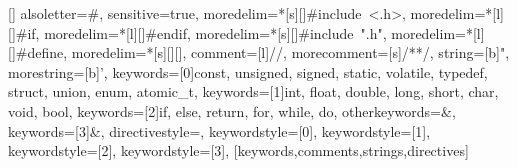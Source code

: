                   []{}
                  { alsoletter={\#},
                    sensitive=true,
                    moredelim=*[s][{\color{violet!60!white}}]{\#include\ <}{.h>},
                    moredelim=*[l][{\color{blue!65!white}}]\#if,
                    moredelim=*[l][{\color{blue!65!white}}]\#endif,
                    moredelim=*[s][{\color{violet!60!white!70!black}}]{\#include\ "}{.h"},
                    moredelim=*[l][{\color{blue!90!white!70!black}}]\#define,
                    moredelim=*[s][{\color{turquoise!70!black}}]{[}{]},
                    comment=[l]//,
                    morecomment=[s]{/*}{*/},
                    string=[b]{"},
                    morestring=[b]{'},
                    keywords=[0]{const, unsigned, signed, static, volatile, typedef, struct, union, enum, atomic_t},
                    keywords=[1]{int, float, double, long, short, char, void, bool},
                    keywords=[2]{if, else, return, for, while, do},
                    otherkeywords={&},
                    keywords=[3]{&},
                    directivestyle=\color{blue!85!white},
                    keywordstyle=[0]\color{cherryred},
                    keywordstyle=[1]\color{green!75!black},
                    keywordstyle=[2]\color{cherryred},
                    keywordstyle=[3]\color{naplesyellow!75!black},
                  }[keywords,comments,strings,directives]
